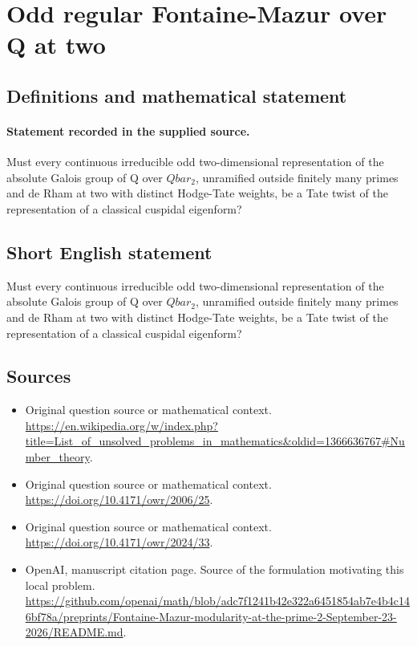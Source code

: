 \documentclass[11pt]{article}
\begin{document}
\section*{Odd regular Fontaine-Mazur over Q at two}\label{30007261}
\subsection{Definitions and mathematical statement}
\paragraph{Statement recorded in the supplied source.}
Must every continuous irreducible odd two-dimensional representation of the absolute Galois group of Q over $Qbar_2$, unramified outside finitely many primes and de Rham at two with distinct Hodge-Tate weights, be a Tate twist of the representation of a classical cuspidal eigenform?
\subsection{Short English statement}
Must every continuous irreducible odd two-dimensional representation of the absolute Galois group of Q over $Qbar_2$, unramified outside finitely many primes and de Rham at two with distinct Hodge-Tate weights, be a Tate twist of the representation of a classical cuspidal eigenform?
\subsection{Sources}
\begin{itemize}
\item[S1] Original question source or mathematical context.
\url{https://en.wikipedia.org/w/index.php?title=List_of_unsolved_problems_in_mathematics&oldid=1366636767#Number_theory}.
\item[S2] Original question source or mathematical context.
\url{https://doi.org/10.4171/owr/2006/25}.
\item[S3] Original question source or mathematical context.
\url{https://doi.org/10.4171/owr/2024/33}.
\item[S4] OpenAI, manuscript citation page. Source of the formulation motivating this local problem.
\url{https://github.com/openai/math/blob/adc7f1241b42e322a6451854ab7e4b4c146bf78a/preprints/Fontaine-Mazur-modularity-at-the-prime-2-September-23-2026/README.md}.
\end{itemize}
\end{document}
